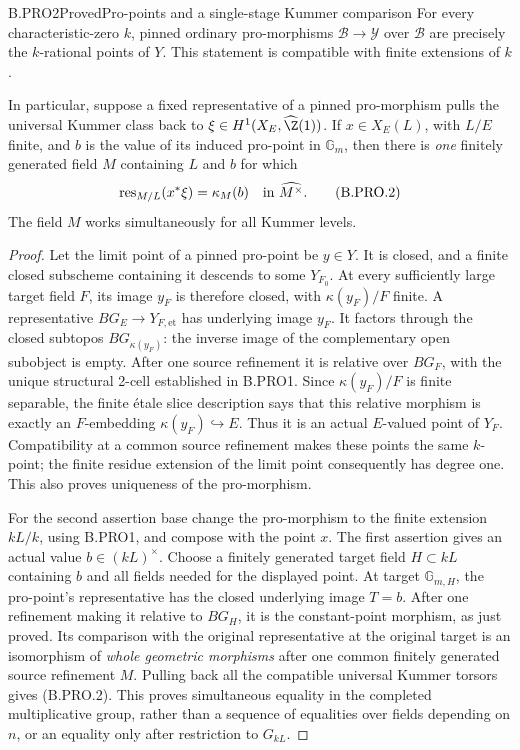 \begin{claim}{B.PRO2}{Proved}{Pro-points and a single-stage Kummer comparison}
For every characteristic-zero \(k\), pinned ordinary pro-morphisms
\(\mathcal B\to\mathcal Y\) over \(\mathcal B\) are precisely
the \(k\)-rational points of \(Y\). This statement is compatible
with finite extensions of \(k\).

In particular, suppose a fixed representative of a pinned
pro-morphism pulls the universal Kummer class back to
\(\xi\in H^1(X_E,\widehat\Z(1))\). If \(x\in X_E(L)\), with
\(L/E\) finite, and \(b\) is the value of its induced pro-point
in \(\mathbb G_m\), then there is \emph{one} finitely generated
field \(M\) containing \(L\) and \(b\) for which
\[
        \operatorname{res}_{M/L}(x^*\xi)=\kappa_M(b)
                \quad\hbox{in }\widehat{M^\times}.       \tag{B.PRO.2}
\]
The field \(M\) works simultaneously for all Kummer levels.
\end{claim}
\begin{proof}
Let the limit point of a pinned pro-point be \(y\in Y\).
It is closed, and a finite closed subscheme containing it descends
to some \(Y_{F_0}\). At every sufficiently large target field
\(F\), its image \(y_F\) is therefore closed, with
\(\kappa(y_F)/F\) finite. A representative
\(BG_E\to Y_{F,\mathrm{et}}\) has underlying image \(y_F\).
It factors through the closed subtopos
\(B G_{\kappa(y_F)}\): the inverse image of the complementary
open subobject is empty. After one source refinement it is
relative over \(BG_F\), with the unique structural 2-cell
established in B.PRO1. Since \(\kappa(y_F)/F\) is finite
separable, the finite étale slice description says that this
relative morphism is exactly an \(F\)-embedding
\(\kappa(y_F)\hookrightarrow E\). Thus it is an actual
\(E\)-valued point of \(Y_F\). Compatibility at a common
source refinement makes these points the same \(k\)-point;
the finite residue extension of the limit point consequently
has degree one. This also proves uniqueness of the pro-morphism.

For the second assertion base change the pro-morphism to the
finite extension \(kL/k\), using B.PRO1, and compose with the
point \(x\). The first assertion gives an actual value
\(b\in(kL)^\times\). Choose a finitely generated target field
\(H\subset kL\) containing \(b\) and all fields needed for the
displayed point. At target \(\mathbb G_{m,H}\), the pro-point's
representative has the closed underlying image \(T=b\).
After one refinement making it relative to \(BG_H\), it is
the constant-point morphism, as just proved. Its comparison
with the original representative at the original target is an
isomorphism of \emph{whole geometric morphisms} after one common
finitely generated source refinement \(M\). Pulling back all
the compatible universal Kummer torsors gives (B.PRO.2).
This proves simultaneous equality in the completed multiplicative
group, rather than a sequence of equalities over fields depending
on \(n\), or an equality only after restriction to \(G_{kL}\).
\end{proof}

